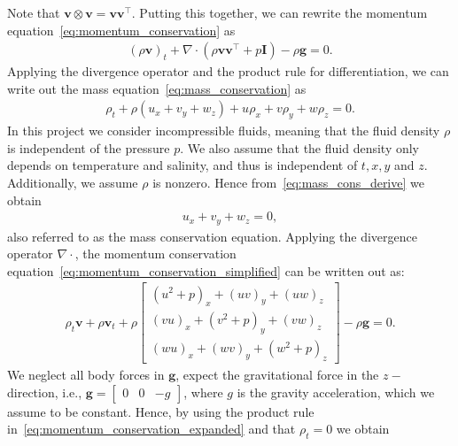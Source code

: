Note that $\mathbf{v} \otimes \mathbf{v} = \mathbf{v} \mathbf{v}^\top$.
Putting this together, we can rewrite the momentum equation~\eqref{eq:momentum_conservation} as
\begin{align}\label{eq:momentum_conservation_simplified}
    {(\rho \mathbf{v})}_t + \nabla \cdot (\rho \mathbf{v} \mathbf{v}^\top  + p \mathbf{I}) - \rho \mathbf{g} = 0.
\end{align}
Applying the divergence operator and the product rule for differentiation, we can write out the mass equation~\eqref{eq:mass_conservation} as
\begin{align}\label{eq:mass_cons_derive}
    \rho_t + \rho(u_x + v_y + w_z) + u \rho_x + v \rho_y + w \rho_z = 0.
\end{align}
In this project we consider incompressible fluids, meaning that the fluid density $\rho$ is independent of the pressure $p$.
We also assume that the fluid density only depends on temperature and salinity, and thus is independent of $t, x, y$ and $z$.
Additionally, we assume $\rho$ is nonzero.
Hence from~\eqref{eq:mass_cons_derive} we obtain
\begin{align}
    u_x + v_y + w_z = 0, \label{eq:mass_conservation_incompressible}
\end{align}
also referred to as the mass conservation equation.
Applying the divergence operator $\nabla \cdot$, the momentum conservation equation~\eqref{eq:momentum_conservation_simplified} can be written out as:
\begin{align}\label{eq:momentum_conservation_expanded}
    \rho_t \mathbf{v} + \rho \mathbf{v}_t + \rho \begin{bmatrix}
        {(u^2 + p)}_x + {(uv)}_y + {(uw)}_z \\
        {(vu)}_x + {(v^2 + p)}_y + {(vw)}_z \\
        {(wu)}_x + {(wv)}_y + {(w^2 + p)}_z 
    \end{bmatrix}
    - \rho \mathbf{g} = 0.
\end{align}
We neglect all body forces in $\mathbf{g}$, expect the gravitational force in the $z-$direction, i.e., $\mathbf{g} = \begin{bmatrix} 0 & 0 & -g \end{bmatrix}$, where $g$ is the gravity acceleration, which we assume to be constant.
Hence, by using the product rule in~\eqref{eq:momentum_conservation_expanded} and that $\rho_t = 0$ we obtain
